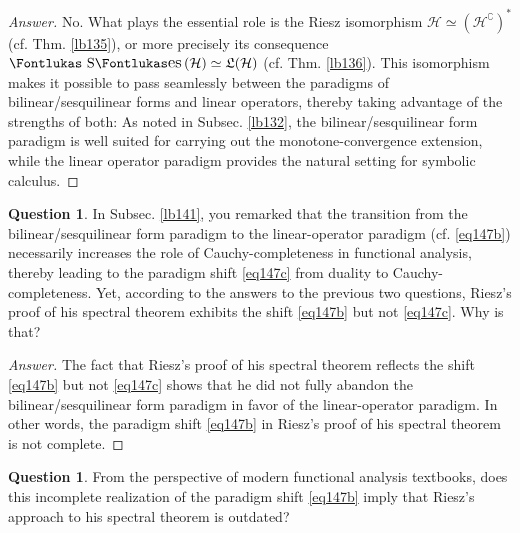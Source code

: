 \documentclass[12pt,b5paper,notitlepage]{article}
\theoremstyle{definition}
\newtheorem{question}[df]{Question}
\theoremstyle{plain}
\DeclareMathOperator{\Ses}{\text{\Fontlukas S}\text{\kern -0pt {\Fontlukas\large es}}\,}
\newcommand{\fk}{\mathfrak}
\newcommand{\Co}{\complement}
\newcommand{\MH}{\mathcal H}
\numberwithin{equation}{section}
\begin{document}
\begin{proof}[Answer]
No. What plays the essential role is the Riesz isomorphism $\MH\simeq(\MH^\Co)^*$ (cf. Thm. \ref{lb135}), or more precisely its consequence $\Ses(\MH)\simeq\fk L(\MH)$ (cf. Thm. \ref{lb136}). This isomorphism makes it possible to pass seamlessly between the paradigms of bilinear/sesquilinear forms and linear operators, thereby taking advantage of the strengths of both: As noted in Subsec. \ref{lb132}, the bilinear/sesquilinear form paradigm is well suited for carrying out the monotone-convergence extension, while the linear operator paradigm provides the natural setting for symbolic calculus.
\end{proof}




\begin{question}
In Subsec. \ref{lb141}, you remarked that the transition from the bilinear/sesquilinear form paradigm to the linear-operator paradigm (cf. \eqref{eq147b}) necessarily increases the role of Cauchy-completeness in functional analysis, thereby leading to the paradigm shift \eqref{eq147c} from duality to Cauchy-completeness. Yet, according to the answers to the previous two questions, Riesz's proof of his spectral theorem exhibits the shift \eqref{eq147b} but not \eqref{eq147c}. Why is that?
\end{question}


\begin{proof}[Answer]
The fact that Riesz's proof of his spectral theorem reflects the shift \eqref{eq147b} but not \eqref{eq147c} shows that he did not fully abandon the bilinear/sesquilinear form paradigm in favor of the linear-operator paradigm. In other words, the paradigm shift \eqref{eq147b} in Riesz's proof of his spectral theorem is not complete.
\end{proof}


\begin{question}
From the perspective of modern functional analysis textbooks, does this incomplete realization of the paradigm shift \eqref{eq147b} imply that Riesz's approach to his spectral theorem is outdated?
\end{question}
\end{document}
